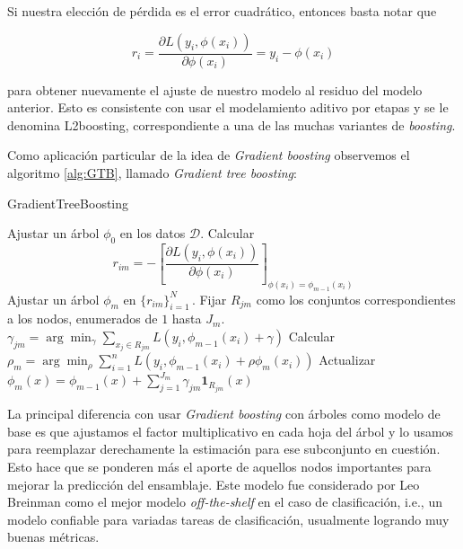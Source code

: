 Si nuestra elección de pérdida es el error cuadrático, entonces basta notar que

$$ r_i = \frac{\partial L(y_i, \phi(x_i))}{\partial \phi(x_i)} = y_i - \phi(x_i) $$

para obtener nuevamente el ajuste de nuestro modelo al residuo del modelo anterior. Esto es consistente con usar el modelamiento aditivo por etapas y se le denomina L2boosting, correspondiente a una de las muchas variantes de \textit{boosting}.

Como aplicación particular de la idea de \textit{Gradient boosting} observemos el algoritmo \ref{alg:GTB}, llamado \textit{Gradient tree boosting}:

\begin{algorithm}[H]
\caption{GradientTreeBoosting
\label{alg:GTB}}
    \begin{algorithmic}[1]
        \State Ajustar un árbol $\phi_0$ en los datos $\mathcal{D}$.
            \State Calcular 
            $$ r_{im} = - \left[ \frac{\partial L(y_i, \phi(x_i))}{\partial \phi(x_i)} \right]_{\phi(x_i) = \phi_{m-1}(x_i)} $$
            \State Ajustar un árbol $\phi_m$ en $\{r_{im}\}^N_{i=1}$\,.
            \State Fijar $R_{jm}$ como los conjuntos correspondientes a los nodos, enumerados de $1$ hasta $J_m$.
                \State $\gamma_{jm} = \arg\min_\gamma \sum_{x_j \in R_{jm}} L(y_i,\phi_{m-1}(x_i)+\gamma)$
            \EndFor
            \State Calcular $\rho_m = \arg\min_\rho \sum^n_{i=1} L(y_i,\phi_{m-1}(x_i) + \rho \phi_m(x_i))$
            \State Actualizar $\phi_m(x) = \phi_{m-1}(x) + \sum^{J_m}_{j=1} \gamma_{jm} \mathbf{1}_{R_{jm}}(x) $
        \EndFor
    \EndFunction
    \end{algorithmic}
\end{algorithm}

La principal diferencia con usar \textit{Gradient boosting} con árboles como modelo de base es que ajustamos el factor multiplicativo en cada hoja del árbol y lo usamos para reemplazar derechamente la estimación para ese subconjunto en cuestión. Esto hace que se ponderen más el aporte de aquellos nodos importantes para mejorar la predicción del ensamblaje. Este modelo fue considerado por Leo Breinman como el mejor modelo \textit{off-the-shelf} en el caso de clasificación, i.e., un modelo confiable para variadas tareas de clasificación, usualmente logrando muy buenas métricas.


